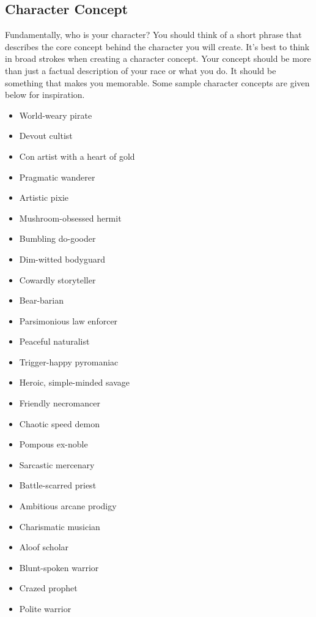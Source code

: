     \subsection{Character Concept}

        Fundamentally, who is your character?
        You should think of a short phrase that describes the core concept behind the character you will create.
        It's best to think in broad strokes when creating a character concept.
        Your concept should be more than just a factual description of your race or what you do.
        It should be something that makes you memorable.
        Some sample character concepts are given below for inspiration.

        \begin{itemize}
            \item World-weary pirate
            \item Devout cultist
            \item Con artist with a heart of gold
            \item Pragmatic wanderer
            \item Artistic pixie
            \item Mushroom-obsessed hermit
            \item Bumbling do-gooder
            \item Dim-witted bodyguard
            \item Cowardly storyteller
            \item Bear-barian
            \item Parsimonious law enforcer
            \item Peaceful naturalist
            \item Trigger-happy pyromaniac
            \item Heroic, simple-minded savage
            \item Friendly necromancer
            \item Chaotic speed demon
            \item Pompous ex-noble
            \item Sarcastic mercenary
            \item Battle-scarred priest
            \item Ambitious arcane prodigy
            \item Charismatic musician
            \item Aloof scholar
            \item Blunt-spoken warrior
            \item Crazed prophet
            \item Polite warrior
        \end{itemize}

